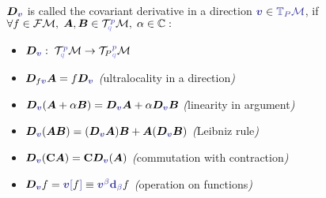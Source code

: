 \begin{definition}
\label{def:covariantDerivative}
    $\bm D_{\bluee{\bm v}}$ is called the covariant derivative in a direction $\bluee{\bm v} \in \bluee{\T_P\M}$, if $\forall f\in\FM, \; \bm A,\bm B\in \TT^{\bluee p}_{\blueee q} \M,\; \alpha\in\C: $
    \begin{itemize}
        \item $\bm D_{\bluee{\bm v}}:\; \TT^{\bluee p}_{\blueee q} \M \rightarrow {\TT_P}^{\bluee p}_{\blueee q} \M$
        \item $\bm D_{f\bluee{\bm v}}\bm A=f\bm D_{\bluee{\bm v}} $ \emph(ultralocality in a direction\emph)
        \item $\bm D_{\bluee{\bm v}}(\bm A+\alpha \bm B)=\bm D_{\bluee{\bm v}}\bm A+\alpha\bm D_{\bluee{\bm v}}\bm B$ \emph(linearity in argument\emph)
        \item $\bm D_{\bluee{\bm v}}(\bm{AB})=(\bm D_{\bluee{\bm v}}\bm A)\bm B+\bm A(\bm D_{\bluee{\bm v}}\bm B)$ \emph(Leibniz rule\emph)
        \item $\bm D_{\bluee{\bm v}}(\mathbf C \bm A)=\mathbf C \bm D_{\bluee{\bm v}}(\bm A)$ \emph(commutation with contraction\emph)
        \item $\bm D_{\bluee{\bm v}}f=\bluee{\bm v[}f\bluee ]\equiv\bluee{\bm v^\beta \bm \d_\beta} f$ \emph(operation on functions\emph)
    \end{itemize}
\end{definition}


    
